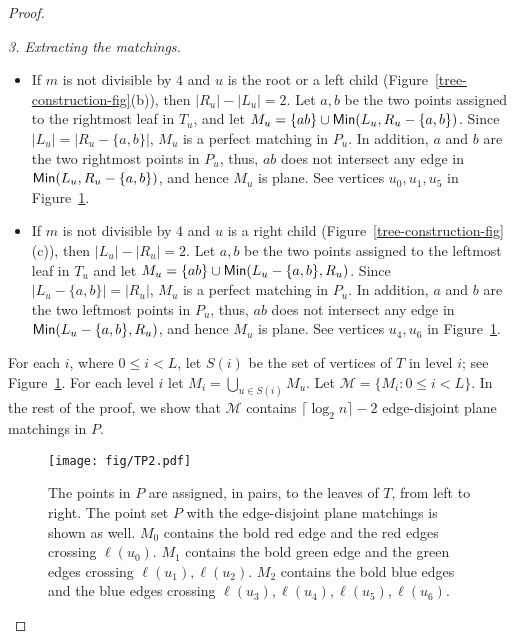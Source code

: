 \documentclass[11pt,a4paper]{article}
\newcommand{\Min}[2]{\text{\sf Min$(#1,#2)$}}
\begin{document}
\begin{proof}
\begin{paragraph}{\em \small 3. Extracting the matchings.}
\begin{itemize}
  \item If $m$ is not divisible by $4$ and $u$ is the root or a left child (Figure~\ref{tree-construction-fig}(b)), then $|R_u|-|L_u|=2$. Let $a,b$ be the two points assigned to the rightmost leaf in $T_u$, and let $M_u=\{ab\}\cup\Min{L_u}{R_u-\{a,b\}}$. Since $|L_u|=|R_u-\{a,b\}|$, $M_u$ is a perfect matching in $P_u$. In addition, $a$ and $b$ are the two rightmost points in $P_u$, thus, $ab$ does not intersect any edge in $\Min{L_u}{R_u-\{a,b\}}$, and hence $M_u$ is plane. See vertices $u_0, u_1, u_5$ in Figure~\ref{matching-example-fig}.

  \item If $m$ is not divisible by $4$ and $u$ is a right child (Figure~\ref{tree-construction-fig}(c)), then $|L_u|-|R_u|=2$. Let $a,b$ be the two points assigned to the leftmost leaf in $T_u$ and let $M_u=\{ab\}\cup\Min{L_u-\{a,b\}}{R_u}$. Since $|L_u-\{a,b\}|=|R_u|$, $M_u$ is a perfect matching in $P_u$. In addition, $a$ and $b$ are the two leftmost points in $P_u$, thus, $ab$ does not intersect any edge in $\Min{L_u-\{a,b\}}{R_u}$, and hence $M_u$ is plane. See vertices $u_4, u_6$ in Figure~\ref{matching-example-fig}.
\end{itemize}

For each $i$, where $0\le i< L$, let $S(i)$ be the set of vertices of $T$ in level $i$; see Figure~\ref{matching-example-fig}. For each level $i$ let $M_i=\bigcup_{u\in S(i)}{M_u}$. Let $\mathcal{M}=\{M_i:0\le i< L\}$. 
In the rest of the proof, we show that $\mathcal{M}$ contains $\lceil\log_2{n}\rceil-2$ edge-disjoint plane matchings in $P$.
\end{paragraph}

\begin{figure}[htb]
  \centering
  \texttt{[image: fig/TP2.pdf]}
 \caption{The points in $P$ are assigned, in pairs, to the leaves of $T$, from left to right. The point set $P$ with the edge-disjoint plane matchings is shown as well. $M_0$ contains the bold red edge and the red edges crossing $\ell(u_0)$. $M_1$ contains the bold green edge and the green edges crossing $\ell(u_1), \ell(u_2)$. $M_2$ contains the bold blue edges and the blue edges crossing $\ell(u_3), \allowbreak \ell(u_4), \allowbreak\ell(u_5), \allowbreak\ell(u_6)$.}
  \label{matching-example-fig}
\end{figure}


\end{proof}
\end{document}
